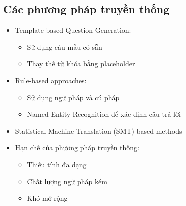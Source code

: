 \subsection{Các phương pháp truyền thống}
\begin{itemize}
    \item Template-based Question Generation:
    \begin{itemize}
        \item Sử dụng câu mẫu có sẵn
        \item Thay thế từ khóa bằng placeholder
    \end{itemize}
    \item Rule-based approaches:
    \begin{itemize}
        \item Sử dụng ngữ pháp và cú pháp
        \item Named Entity Recognition để xác định câu trả lời
    \end{itemize}
    \item Statistical Machine Translation (SMT) based methods
    \item Hạn chế của phương pháp truyền thống:
    \begin{itemize}
        \item Thiếu tính đa dạng
        \item Chất lượng ngữ pháp kém
        \item Khó mở rộng
    \end{itemize}
\end{itemize}

